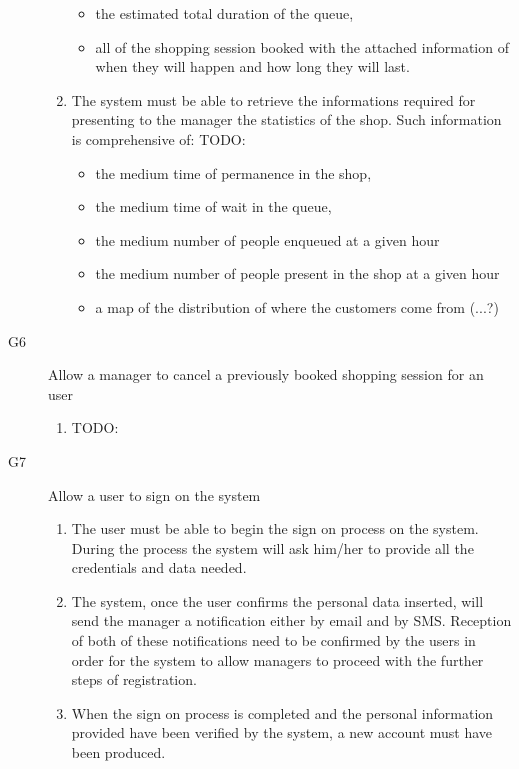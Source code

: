 \begin{description}
\begin{enumerate}[resume*]
\begin{itemize}[topsep=0pt]
                \item the estimated total duration of the queue,
                \item all of the shopping session booked with the attached information of when they will happen and how long they will last.
            \end{itemize}
            \item The system must be able to retrieve the informations required for presenting to the manager the statistics of the shop.\newline
            Such information is comprehensive of: TODO:
            \begin{itemize}[topsep=0pt]
                \item the medium time of permanence in the shop, 
                \item the medium time of wait in the queue,
                \item the medium number of people enqueued at a given hour
                \item the medium number of people present in the shop at a given hour
                \item a map of the distribution of where the customers come from (...?)
            \end{itemize}
        \end{enumerate}
    \item [G6] Allow a manager to cancel a previously booked shopping session for an user
        \begin{enumerate}[resume*]
            \item TODO:
        \end{enumerate}
    \item [G7] Allow a user to sign on the system
        \begin{enumerate}[resume*]
            \item The user must be able to begin the sign on process on the system. During the process the system will ask him/her to provide all the credentials and data needed.
            \item The system, once the user confirms the personal data inserted, will send the manager a notification either by email and by SMS. Reception of both of these notifications need to be confirmed by the users in order for the system to allow managers to proceed with the further steps of registration.
            \item When the sign on process is completed and the personal information provided have been verified by the system, a new account must have been produced.

\end{enumerate}
\end{description}
